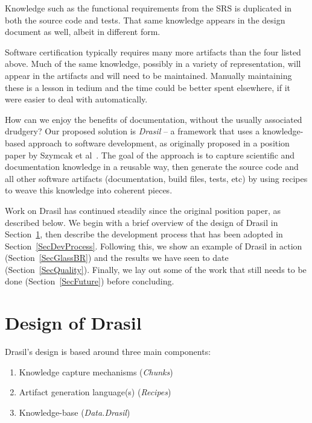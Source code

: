 \documentclass[sigconf]{acmart}
\begin{document}
Knowledge such as the functional requirements from the SRS is duplicated in 
both the source code and tests. That same knowledge appears in the design 
document as well, albeit in different form. 

Software certification typically requires many more 
artifacts than the four listed above. Much of the same knowledge, possibly in a
variety of representation, will appear in the artifacts and will need to be
maintained. Manually maintaining these is a lesson in tedium and the
time could be better spent elsewhere, if 
it were easier to deal with automatically.


How can we enjoy the benefits of documentation, without the usually associated
drudgery?  Our proposed solution is \textit{Drasil} -- a framework that uses
a knowledge-based approach to software development, as originally proposed in a
position paper by Szymcak et al~\cite{SzymczakEtAl2016}. The goal of the
approach is to capture scientific and documentation knowledge in a reusable way,
then generate the source code and all other software artifacts
(documentation, build files, tests, etc) by using recipes to weave this
knowledge into coherent pieces.

Work on Drasil has continued steadily since the original position paper, as
described below. We begin with a brief overview of the design of Drasil
in Section~\ref{SecDesign}, then describe the development process that
has been adopted in Section~\ref{SecDevProcess}. Following this, we show an example of
Drasil in action (Section~\ref{SecGlassBR}) and the results we have seen to date
(Section~\ref{SecQuality}). Finally, we lay out some of the work that still
needs to be done (Section~\ref{SecFuture}) before concluding.

\newpage
\section{Design of Drasil} \label{SecDesign}

Drasil's design is based around three main components:
\begin{enumerate}
    \item Knowledge capture mechanisms (\textit{Chunks})
    \item Artifact generation language(s) (\textit{Recipes})
    \item Knowledge-base (\textit{Data.Drasil})
\end{enumerate}
\end{document}

